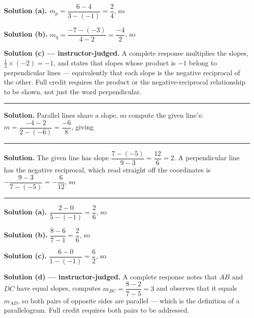 \documentclass[12pt]{article}
\begin{document}
\noindent\textbf{Solution (a).} $m_p = \dfrac{6-4}{3-(-1)} = \dfrac{2}{4}$, so

\noindent\textbf{Solution (b).} $m_q = \dfrac{-7-(-3)}{4-2} = \dfrac{-4}{2}$, so

\noindent\textbf{Solution (c) --- instructor-judged.} A complete response
multiplies the slopes, $\tfrac{1}{2} \times (-2) = -1$, and states that slopes
whose product is $-1$ belong to perpendicular lines --- equivalently that each
slope is the negative reciprocal of the other. Full credit requires the product
or the negative-reciprocal relationship to be shown, not just the word
perpendicular.

\vspace{0.15cm}\noindent\rule{\linewidth}{0.2pt}


\noindent\textbf{Solution.} Parallel lines share a slope, so compute the given
line's: $m = \dfrac{-4-2}{2-(-6)} = \dfrac{-6}{8}$, giving

\vspace{0.15cm}\noindent\rule{\linewidth}{0.2pt}


\noindent\textbf{Solution.} The given line has slope
$\dfrac{7-(-5)}{9-3} = \dfrac{12}{6} = 2$. A perpendicular line has the negative
reciprocal, which read straight off the coordinates is
$-\dfrac{9-3}{7-(-5)} = -\dfrac{6}{12}$, so 

\vspace{0.15cm}\noindent\rule{\linewidth}{0.2pt}


\noindent\textbf{Solution (a).} $\dfrac{2-0}{5-(-1)} = \dfrac{2}{6}$, so

\noindent\textbf{Solution (b).} $\dfrac{8-6}{7-1} = \dfrac{2}{6}$, so

\noindent\textbf{Solution (c).} $\dfrac{6-0}{1-(-1)} = \dfrac{6}{2}$, so

\noindent\textbf{Solution (d) --- instructor-judged.} A complete response notes
that $\overline{AB}$ and $\overline{DC}$ have equal slopes, computes
$m_{BC} = \dfrac{8-2}{7-5} = 3$ and observes that it equals $m_{AD}$, so both
pairs of opposite sides are parallel --- which is the definition of a
parallelogram. Full credit requires both pairs to be addressed.
\end{document}
